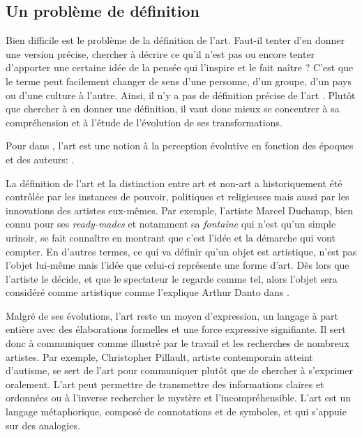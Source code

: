 \documentclass[12pt]{article} %
\begin{document}
\subsection{Un problème de définition}
Bien difficile est le problème de la définition de l'art. Faut-il tenter d'en donner une version précise, chercher à décrire ce qu'il n'est pas ou encore tenter d'apporter une certaine idée de la pensée qui l'inspire et le fait naître ? C'est que le terme peut facilement changer de sens d'une personne, d'un groupe, d'un pays ou d'une culture à l'autre. Ainsi, il n'y a pas de définition précise de l'art \cite{SDavies1991}. Plutôt que chercher à en donner une définition, il vaut donc mieux se concentrer à sa compréhension et à l'étude de l'évolution de ses transformations. 

Pour \citeauthor{SDavies1991} dans , l'art est une notion à la perception évolutive en fonction des époques et des auteurs:  \cite{SDavies1991}. 

La définition de l'art et la distinction entre art et non-art a historiquement été contrôlée par les instances de pouvoir, politiques et religieuses mais aussi par les innovations des artistes eux-mêmes. Par exemple, l'artiste Marcel Duchamp, bien connu pour ses \textit{ready-mades} et notamment sa \textit{fontaine} qui n'est qu'un simple urinoir, se fait connaître en montrant que c'est l'idée et la démarche qui vont compter. En d'autres termes, ce qui va définir qu'un objet est artistique, n'est pas l'objet lui-même mais l'idée que celui-ci représente une forme d'art. Dès lors que l'artiste le décide, et que le spectateur le regarde comme tel, alors l'objet sera considéré comme artistique comme l'explique Arthur Danto dans  \cite{ADanto1989}. 

Malgré de ses évolutions, l'art reste un moyen d'expression, un langage à part entière avec des élaborations formelles et une force expressive signifiante. Il sert donc à communiquer comme illustré par le travail et les recherches de nombreux artistes. Par exemple, Christopher Pillault, artiste contemporain atteint d'autisme, se sert de l'art pour communiquer plutôt que de chercher à s'exprimer oralement. L'art peut permettre de transmettre des informations claires et ordonnées ou à l'inverse rechercher le mystère et l'incompréhensible. L'art est un langage métaphorique, composé de connotations et de symboles, et qui s'appuie sur des analogies. 
\end{document}
